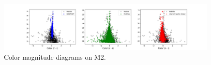\begin{figure}[h]
    \centering
    \includegraphics[width=0.99\textwidth]{figures/cmd.png}
    \caption{Color magnitude diagrams on M2. }
    \label{fig:cmd_m2}
\end{figure}

